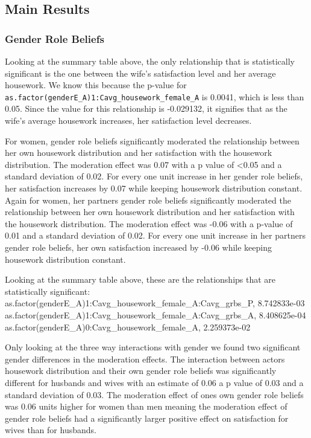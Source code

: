 \documentclass[
  english,
  man,floatsintext]{apa6}
\begin{document}
\hypertarget{main-results}{%
\subsection{Main Results}\label{main-results}}

\hypertarget{gender-role-beliefs}{%
\subsubsection{Gender Role Beliefs}\label{gender-role-beliefs}}

Looking at the summary table above, the only relationship that is statistically significant is the one between the wife's satisfaction level and her average housework. We know this because the p-value for \texttt{as.factor(genderE\_A)1:Cavg\_housework\_female\_A} is 0.0041, which is less than 0.05. Since the value for this relationship is -0.029132, it signifies that as the wife's average housework increases, her satisfaction level decreases.

For women, gender role beliefs significantly moderated the relationship between her own housework distribution and her satisfaction with the housework distribution. The moderation effect was 0.07 with a p value of \textless0.05 and a standard deviation of 0.02. For every one unit increase in her gender role beliefs, her satisfaction increases by 0.07 while keeping housework distribution constant. Again for women, her partners gender role beliefs significantly moderated the relationship between her own housework distribution and her satisfaction with the housework distribution. The moderation effect was -0.06 with a p-value of 0.01 and a standard deviation of 0.02. For every one unit increase in her partners gender role beliefs, her own satisfaction increased by -0.06 while keeping housework distribution constant.

Looking at the summary table above, these are the relationships that are statistically significant:
as.factor(genderE\_A)1:Cavg\_housework\_female\_A:Cavg\_grbs\_P, 8.742833e-03
as.factor(genderE\_A)1:Cavg\_housework\_female\_A:Cavg\_grbs\_A, 8.408625e-04
as.factor(genderE\_A)0:Cavg\_housework\_female\_A, 2.259373e-02

Only looking at the three way interactions with gender we found two significant gender differences in the moderation effects. The interaction between actors housework distribution and their own gender role beliefs was significantly different for husbands and wives with an estimate of 0.06 a p value of 0.03 and a standard deviation of 0.03. The moderation effect of ones own gender role beliefs was 0.06 units higher for women than men meaning the moderation effect of gender role beliefs had a significantly larger positive effect on satisfaction for wives than for husbands.
\end{document}
